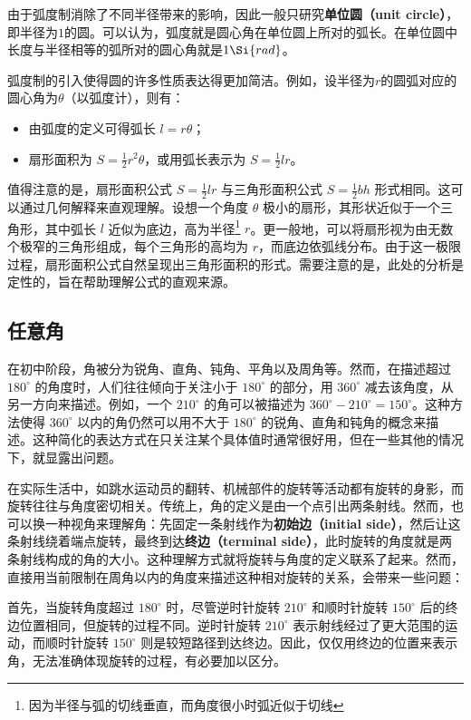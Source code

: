 由于弧度制消除了不同半径带来的影响，因此一般只研究\textbf{单位圆（unit circle）}，即半径为$1$的圆。可以认为，弧度就是圆心角在单位圆上所对的弧长。在单位圆中长度与半径相等的弧所对的圆心角就是$1 \Si{rad}$。

弧度制的引入使得圆的许多性质表达得更加简洁。例如，设半径为$r$的圆弧对应的圆心角为$\theta$（以弧度计），则有：
\begin{itemize}
\item 由弧度的定义可得弧长 $l = r\theta$；
\item 扇形面积为 $\displaystyle S = \frac{1}{2} r^2 \theta$，或用弧长表示为 $\displaystyle S = \frac{1}{2} l r$。
\end{itemize}

值得注意的是，扇形面积公式 $\displaystyle S = \frac{1}{2} l r$ 与三角形面积公式 $\displaystyle S = \frac{1}{2} bh$ 形式相同。这可以通过几何解释来直观理解。设想一个角度 $\theta$ 极小的扇形，其形状近似于一个三角形，其中弧长 $l$ 近似为底边，高为半径\footnote{因为半径与弧的切线垂直，而角度很小时弧近似于切线} $r$。更一般地，可以将扇形视为由无数个极窄的三角形组成，每个三角形的高均为 $r$，而底边依弧线分布。由于这一极限过程，扇形面积公式自然呈现出三角形面积的形式。需要注意的是，此处的分析是定性的，旨在帮助理解公式的直观来源。


\subsection{任意角}

在初中阶段，角被分为锐角、直角、钝角、平角以及周角等。然而，在描述超过 $180^\circ$ 的角度时，人们往往倾向于关注小于 $180^\circ$ 的部分，用 $360^\circ$ 减去该角度，从另一方向来描述。例如，一个 $210^\circ$ 的角可以被描述为 $360^\circ - 210^\circ = 150^\circ$。这种方法使得 $360^\circ$ 以内的角仍然可以用不大于 $180^\circ$ 的锐角、直角和钝角的概念来描述。这种简化的表达方式在只关注某个具体值时通常很好用，但在一些其他的情况下，就显露出问题。

在实际生活中，如跳水运动员的翻转、机械部件的旋转等活动都有旋转的身影，而旋转往往与角度密切相关。传统上，角的定义是由一个点引出两条射线。然而，也可以换一种视角来理解角：先固定一条射线作为\textbf{初始边（initial side）}，然后让这条射线绕着端点旋转，最终到达\textbf{终边（terminal side）}，此时旋转的角度就是两条射线构成的角的大小。这种理解方式就将旋转与角度的定义联系了起来。然而，直接用当前限制在周角以内的角度来描述这种相对旋转的关系，会带来一些问题：

首先，当旋转角度超过 $180^\circ$ 时，尽管逆时针旋转 $210^\circ$ 和顺时针旋转 $150^\circ$ 后的终边位置相同，但旋转的过程不同。逆时针旋转 $210^\circ$ 表示射线经过了更大范围的运动，而顺时针旋转 $150^\circ$ 则是较短路径到达终边。因此，仅仅用终边的位置来表示角，无法准确体现旋转的过程，有必要加以区分。

